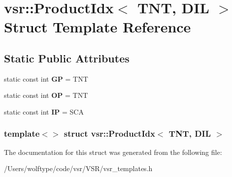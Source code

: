 \hypertarget{structvsr_1_1_product_idx_3_01_t_n_t_00_01_d_i_l_01_4}{\section{vsr\-:\-:Product\-Idx$<$ T\-N\-T, D\-I\-L $>$ Struct Template Reference}
\label{structvsr_1_1_product_idx_3_01_t_n_t_00_01_d_i_l_01_4}
}
\subsection*{Static Public Attributes}
\begin{DoxyCompactItemize}
\item 
\hypertarget{structvsr_1_1_product_idx_3_01_t_n_t_00_01_d_i_l_01_4_ac5a0a39e9a1808061ba38f4edd99e3d5}{static const int {\bfseries G\-P} = T\-N\-T}\label{structvsr_1_1_product_idx_3_01_t_n_t_00_01_d_i_l_01_4_ac5a0a39e9a1808061ba38f4edd99e3d5}

\item 
\hypertarget{structvsr_1_1_product_idx_3_01_t_n_t_00_01_d_i_l_01_4_af6ab0eef3ca9319d31813541007d2f0c}{static const int {\bfseries O\-P} = T\-N\-T}\label{structvsr_1_1_product_idx_3_01_t_n_t_00_01_d_i_l_01_4_af6ab0eef3ca9319d31813541007d2f0c}

\item 
\hypertarget{structvsr_1_1_product_idx_3_01_t_n_t_00_01_d_i_l_01_4_ae4706e2604dfca9845aefefd505c9515}{static const int {\bfseries I\-P} = S\-C\-A}\label{structvsr_1_1_product_idx_3_01_t_n_t_00_01_d_i_l_01_4_ae4706e2604dfca9845aefefd505c9515}

\end{DoxyCompactItemize}
\subsubsection*{template$<$$>$ struct vsr\-::\-Product\-Idx$<$ T\-N\-T, D\-I\-L $>$}



The documentation for this struct was generated from the following file\-:\begin{DoxyCompactItemize}
\item 
/\-Users/wolftype/code/vsr/\-V\-S\-R/vsr\-\_\-templates.\-h\end{DoxyCompactItemize}
